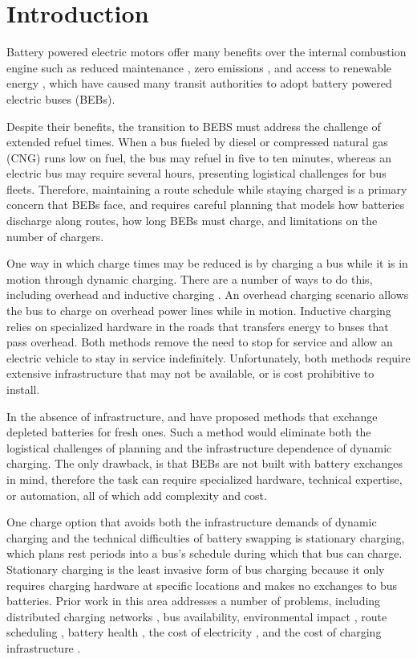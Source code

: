 \section{Introduction}
\par  Battery powered electric motors offer many benefits over the internal combustion engine \cite{Mahmoud2016} such as reduced maintenance \cite{poornesh_comparative_2020}, zero emissions \cite{kato_comparative_2013}, and access to renewable energy \cite{cheng_smart_2020}, which have caused many transit authorities to adopt battery powered electric buses (BEBs). 
\par Despite their benefits, the transition to BEBS must address the challenge of extended refuel times. When a bus fueled by diesel or compressed natural gas (CNG) runs low on fuel, the bus may refuel in five to ten minutes, whereas an electric bus may require several hours, presenting logistical challenges for bus fleets. Therefore, maintaining a route schedule while staying charged is a primary concern that BEBs face, and requires careful planning that models how batteries discharge along routes, how long BEBs must charge, and limitations on the number of chargers. 
\par One way in which charge times may be reduced is by charging a bus while it is in motion through dynamic charging. There are a number of ways to do this, including overhead \cite{csonka_optimization_2021} and inductive charging \cite{jeong_automatic_2018} \cite{balde_electric_2019}. An overhead charging scenario allows the bus to charge on overhead power lines while in motion. Inductive charging relies on specialized hardware in the roads that transfers energy to buses that pass overhead. Both methods remove the need to stop for service and allow an electric vehicle to stay in service indefinitely. Unfortunately, both methods require extensive infrastructure \cite{Alwesabi_2022_Robust} that may not be available, or is cost prohibitive to install.  
\par In the absence of infrastructure, \cite{jain_battery_2020} and \cite{xian_zhang_optimal_2016} have proposed methods that exchange depleted batteries for fresh ones. Such a method would eliminate both the logistical challenges of planning and the infrastructure dependence of dynamic charging. The only drawback, is that BEBs are not built with battery exchanges in mind, therefore the task can require specialized hardware, technical expertise, or automation, all of which add complexity and cost.  
\par One charge option that avoids both the infrastructure demands of dynamic charging and the technical difficulties of battery swapping is stationary charging, which plans rest periods into a bus's schedule during which that bus can charge. Stationary charging is the least invasive form of bus charging because it only requires charging hardware at specific locations and makes no exchanges to bus batteries. Prior work in this area addresses a number of problems, including distributed charging networks \cite{Nimalsiri2020}, bus availability, environmental impact \cite{zhou_bi-objective_2021}, route scheduling \cite{Rinalde_Mixed_2020}, battery health \cite{houbbadi_optimal_2019}, the cost of electricity \cite{Leou_optimal_2017}, and the cost of charging infrastructure \cite{Wei2018}.
